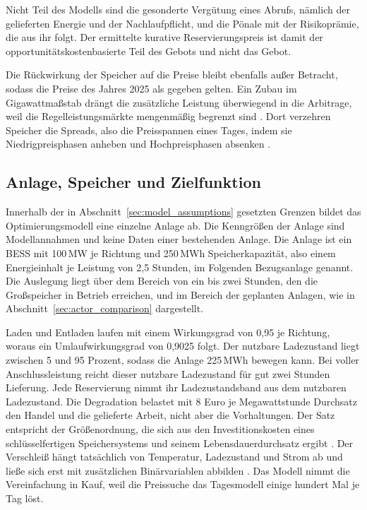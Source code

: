 Nicht Teil des Modells sind die gesonderte Vergütung eines Abrufs, nämlich der gelieferten Energie und der Nachlaufpflicht, und die Pönale mit der Risikoprämie, die aus ihr folgt.
Der ermittelte kurative Reservierungspreis ist damit der opportunitätskostenbasierte Teil des Gebots und nicht das Gebot.

Die Rückwirkung der Speicher auf die Preise bleibt ebenfalls außer Betracht, sodass die Preise des Jahres 2025 als gegeben gelten.
Ein Zubau im Gigawattmaßstab drängt die zusätzliche Leistung überwiegend in die Arbitrage, weil die Regelleistungsmärkte mengenmäßig begrenzt sind \cite{garttan_battery_2025}.
Dort verzehren Speicher die Spreads, also die Preisspannen eines Tages, indem sie Niedrigpreisphasen anheben und Hochpreisphasen absenken \cite{rystad_energy_renewables__power_analytics_energy_2026}.

\label{sec:storage_modelling}

\label{sec:valuation_task}

\label{sec:lp_gurobi}

\subsection{Anlage, Speicher und Zielfunktion}
\label{sec:objective_variables}
\label{sec:storage_model}

Innerhalb der in Abschnitt~\ref{sec:model_assumptions} gesetzten Grenzen bildet das Optimierungsmodell eine einzelne Anlage ab.
Die Kenngrößen der Anlage sind Modellannahmen und keine Daten einer bestehenden Anlage.
Die Anlage ist ein \ac{BESS} mit 100\,\si{MW} je Richtung und 250\,\si{MWh} Speicherkapazität, also einem Energieinhalt je Leistung von 2,5 Stunden, im Folgenden Bezugsanlage genannt.
Die Auslegung liegt über dem Bereich von ein bis zwei Stunden, den die Großspeicher in Betrieb erreichen, und im Bereich der geplanten Anlagen, wie in Abschnitt~\ref{sec:actor_comparison} dargestellt.

Laden und Entladen laufen mit einem Wirkungsgrad von 0,95 je Richtung, woraus ein Umlaufwirkungsgrad von 0,9025 folgt.
Der nutzbare Ladezustand liegt zwischen 5 und 95 Prozent, sodass die Anlage 225\,\si{MWh} bewegen kann.
Bei voller Anschlussleistung reicht dieser nutzbare Ladezustand für gut zwei Stunden Lieferung.
Jede Reservierung nimmt ihr Ladezustandsband aus dem nutzbaren Ladezustand.
Die Degradation belastet mit 8 Euro je Megawattstunde Durchsatz den Handel und die gelieferte Arbeit, nicht aber die Vorhaltungen.
Der Satz entspricht der Größenordnung, die sich aus den Investitionskosten eines schlüsselfertigen Speichersystems und seinem Lebensdauerdurchsatz ergibt \cite{rystad_energy_renewables__power_analytics_energy_2026}.
Der Verschleiß hängt tatsächlich von Temperatur, Ladezustand und Strom ab und ließe sich erst mit zusätzlichen Binärvariablen abbilden \cite{kumtepeli_energy_2020}.
Das Modell nimmt die Vereinfachung in Kauf, weil die Preissuche das Tagesmodell einige hundert Mal je Tag löst.

